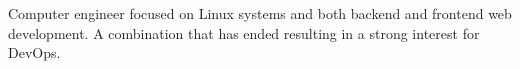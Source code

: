 Computer engineer focused on Linux systems and both backend and frontend web development. A combination that has ended resulting in a strong interest for DevOps.